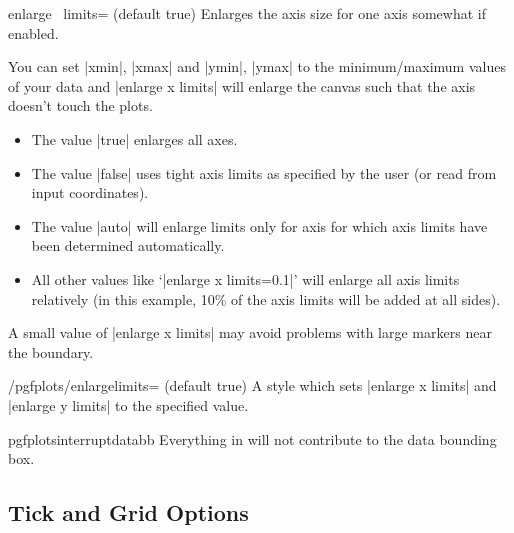 \begin{pgfplotsxykey}{enlarge \x\ limits= (default true)}
Enlarges the axis size for one axis somewhat if enabled.

You can set |xmin|, |xmax| and |ymin|, |ymax| to the minimum/maximum values of your data and |enlarge x limits| will enlarge the canvas such that the axis doesn't touch the plots.

\begin{itemize}
	\item The value |true| enlarges all axes.
	\item The value |false| uses tight axis limits as specified by the user (or read from input coordinates).
	\item The value |auto| will enlarge limits only for axis for which axis limits have been determined automatically.
	\item All other values like `|enlarge x limits=0.1|' will enlarge all axis limits relatively (in this example, 10\% of the axis limits will be added at all sides).
\end{itemize}
A small value of |enlarge x limits| may avoid problems with large markers near the boundary.
\end{pgfplotsxykey}

\begin{stylekey}{/pgfplots/enlargelimits= (default true)}
	A style which sets |enlarge x limits| and |enlarge y limits| to the specified value.
\end{stylekey}

\begin{environment}{{pgfplotsinterruptdatabb}}
	Everything in  will not contribute to the data bounding box.
\end{environment}

\subsection{Tick and Grid Options}

